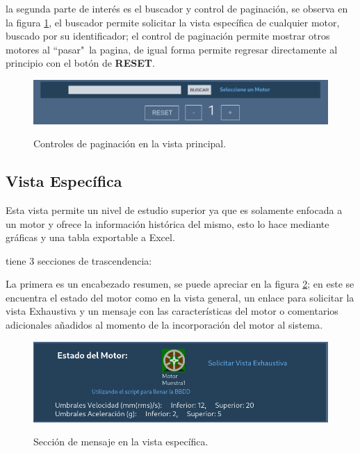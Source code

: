 \documentclass[12pt]{article}
\begin{document}
la segunda parte de interés es el buscador y control de paginación, se observa en
la figura \ref{img:buscadoreGeneral}, el buscador permite solicitar la vista
específica de cualquier motor, buscado por su identificador;
el control de paginación permite mostrar otros motores al ``pasar"\ la pagina,
de igual forma permite regresar directamente al principio con el botón de
\textbf{RESET}.

    \begin{figure}[H]
		\centering
        \caption{Controles de paginación en la vista principal. }
        \includegraphics[width=\linewidth]{ManualUsuario/controles.png}
        \label{img:buscadoreGeneral}
	\end{figure}


\subsection{Vista Específica}
Esta vista permite un nivel de estudio superior ya que es solamente enfocada
a un motor y ofrece la información histórica del mismo, esto lo hace mediante
gráficas y una tabla exportable a Excel.

tiene 3 secciones de trascendencia:

La primera es un encabezado resumen,
se puede apreciar en la figura \ref{img:especificaHeaderManual}; en este se encuentra
el estado del motor como en la vista general, un enlace para solicitar la
vista Exhaustiva y un mensaje con las características del motor o
comentarios adicionales añadidos al momento de la incorporación del motor al
sistema.

    \begin{figure}[H]
		\centering
        \caption{Sección de mensaje en la vista específica. }
        \includegraphics[width=\linewidth]{ManualUsuario/especificaMensaje.png}
        \label{img:especificaHeaderManual}
	\end{figure}
\end{document}
